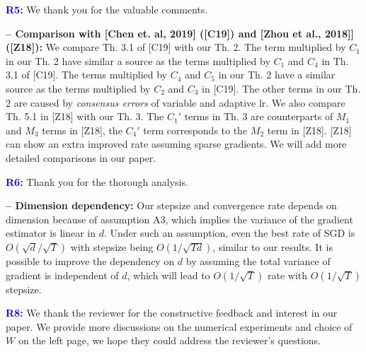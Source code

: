 \documentclass{article} %
\begin{document}
\vspace{-2pt}
\textcolor{blue}{\textbf{R5:}}
We thank you for the valuable comments. \vspace{-4pt}




\textbf{-- Comparison with [Chen et. al, 2019] ([C19]) and [Zhou et al., 2018]] ([Z18]):}
We compare Th. 3.1 of [C19] with our Th. 2. 
The term multiplied by $C_1$ in our Th. 2 have similar a source as the terms multiplied by $C_1$ and $C_4$ in Th. 3.1 of [C19]. 
The terms multiplied by $C_4$ and $C_5$ in our Th. 2 have a similar source as the terms multiplied by $C_2$ and $C_3$ in [C19]. 
The other terms in our Th. 2 are caused by \emph{consensus errors} of variable and adaptive lr. We also compare Th. 5.1 in [Z18] with our Th. 3. The $C_1'$ terms in Th. 3 are counterparts of $M_1$ and $M_3$ terms in [Z18], the $C_4'$ term corresponds to the $M_2$ term in [Z18]. 
[Z18] can show an extra improved rate assuming sparse gradients. 
We will add  more detailed comparisons in our paper. 


\vspace{-2pt}
\textcolor{blue}{\textbf{R6:}}
Thank you for the thorough analysis. \vspace{-4pt}

\textbf{-- Dimension dependency:}
Our stepsize and convergence rate depends on dimension because of assumption A3, which implies the variance of the gradient estimator is linear in $d$. Under such an assumption, even the best rate of SGD is $O(\sqrt{d}/\sqrt{T})$ with stepsize being $O(1/\sqrt{Td})$, similar to our results. It is possible to improve the dependency on $d$ by assuming the total variance of gradient is independent of $d$, which will lead to $O(1/\sqrt{T})$ rate with $O(1/\sqrt{T})$ stepsize.



\vspace{-2pt}
\textcolor{blue}{\textbf{R8:}}
We thank the reviewer for the constructive feedback and interest in our paper. We provide more discussions on the numerical experiments and choice of $W$ on the left page, we hope they could address the reviewer's questions.


\end{document}
